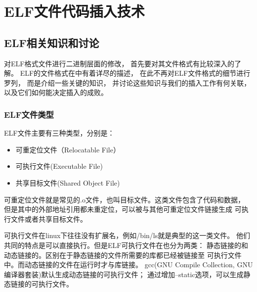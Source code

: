 \chapter{ELF文件代码插入技术}




\section{ELF相关知识和讨论}

对ELF格式文件进行二进制层面的修改，
首先要对其文件格式有比较深入的了解。
ELF的文件格式在\cite{elf1.2}中有着详尽的描述，
在此不再对ELF文件格式的细节进行罗列，
而是介绍一些关键的知识，
并讨论这些知识与我们的插入工作有何关联，
以及它们如何能决定插入的成败。

\subsection{ELF文件类型}

ELF文件主要有三种类型，分别是：

\begin{itemize}
 \item 可重定位文件（Relocatable File）
 \item 可执行文件(Executable File)
 \item 共享目标文件(Shared Object File)
\end{itemize}

可重定位文件就是常见的.o文件，也叫目标文件。这类文件包含了代码和数据，
但是其中的外部地址引用都未重定位，可以被与其他可重定位文件链接生成
可执行文件或者共享目标文件。

可执行文件在linux下往往没有扩展名，例如/bin/ls就是典型的这一类文件。
他们共同的特点是可以直接执行。但是ELF可执行文件在也分为两类：
静态链接的和动态链接的。区别在于静态链接的文件所需要的库都已经被链接至
可执行文件中。而动态链接的文件在运行时才与库链接。
gcc(GNU Compile Collection, GNU编译器套装)默认生成动态链接的可执行文件；
通过增加--static选项，可以生成静态链接的可执行文件。

